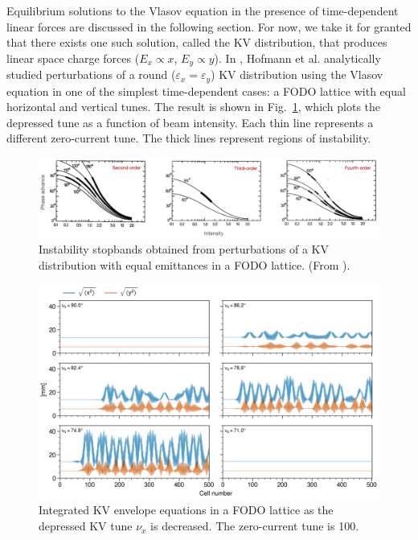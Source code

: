 Equilibrium solutions to the Vlasov equation in the presence of time-dependent linear forces are discussed in the following section. For now, we take it for granted that there exists one such solution, called the KV distribution, that produces linear space charge forces ($E_x \propto x$, $E_y \propto y$). In \cite{Hofmann1983}, Hofmann et al. analytically studied perturbations of a round ($\varepsilon_x = \varepsilon_y$) KV distribution using the Vlasov equation in one of the simplest time-dependent cases: a FODO lattice with equal horizontal and vertical tunes. The result is shown in Fig.~\ref{fig:stopbands}, which plots the depressed tune as a function of beam intensity. Each thin line represents a different zero-current tune. The thick lines represent regions of instability.
%
\begin{figure}[!p]
    \centering
    \includegraphics[width=\textwidth]{Images/chapter1/stopbands_hor.png}
    \caption{Instability stopbands obtained from perturbations of a KV distribution with equal emittances in a FODO lattice. (From \cite{Hofmann1983}).}
    \label{fig:stopbands}
\end{figure}
%
\begin{figure}[!p]
    \centering
    \includegraphics[width=\textwidth]{Images/chapter1/envelope_instability.png}
    \caption{Integrated KV envelope equations in a FODO lattice as the depressed KV tune $\nu_x$ is decreased. The zero-current tune is 100\degree.} \label{fig:envelope_instability}
\end{figure}
%

